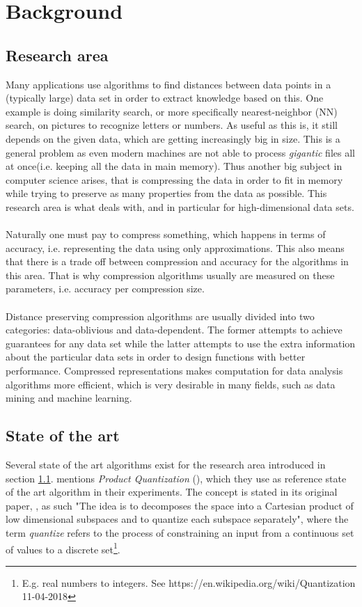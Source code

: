 \section{Background}
\label{background}

\subsection{Research area}
\label{research_area}
Many applications use algorithms to find distances between data points in a (typically large) data set in order to extract knowledge based on this. 
One example is doing similarity search, or more specifically nearest-neighbor (NN) search, on pictures to recognize letters or numbers. As useful as this is, it still depends on the given data, which are getting increasingly big in size. This is a general problem as even modern machines are not able to process \textit{gigantic} files all at once(i.e. keeping all the data in main memory). Thus another big subject in computer science arises, that is compressing the data in order to fit in memory while trying to preserve as many properties from the data as possible. This research area is what \qs{} deals with, and in particular for high-dimensional data sets.
\\
\\
Naturally one must pay to compress something, which happens in terms of accuracy, i.e. representing the data using only approximations. This also means that there is a trade off between compression and accuracy for the algorithms in this area. That is why compression algorithms usually are measured on these parameters, i.e. accuracy per compression size.
\\
\\
Distance preserving compression algorithms are usually divided into two categories: data-oblivious and data-dependent. The former attempts to achieve guarantees for any data set while the latter attempts to use the extra information about the particular data sets in order to design functions with better performance. Compressed representations makes computation for data analysis algorithms more efficient, which is very desirable in many fields, such as data mining and machine learning.\cite{stan15}

\subsection{State of the art}
\label{state_of_the_art}
Several state of the art algorithms exist for the research area introduced in section \ref{research_area}. \cite{wagner17} mentions \textit{Product Quantization} (\pq{}), which they use as reference state of the art algorithm in their experiments. The \pq{} concept is stated in its original paper, \cite{schmid9}, as such "The idea is to decomposes the space into a Cartesian product of low dimensional subspaces and to quantize each subspace separately", where the term \textit{quantize} refers to the process of constraining an input from a continuous set of values to a discrete set\footnote{E.g. real numbers to integers. See https://en.wikipedia.org/wiki/Quantization 11-04-2018}.

